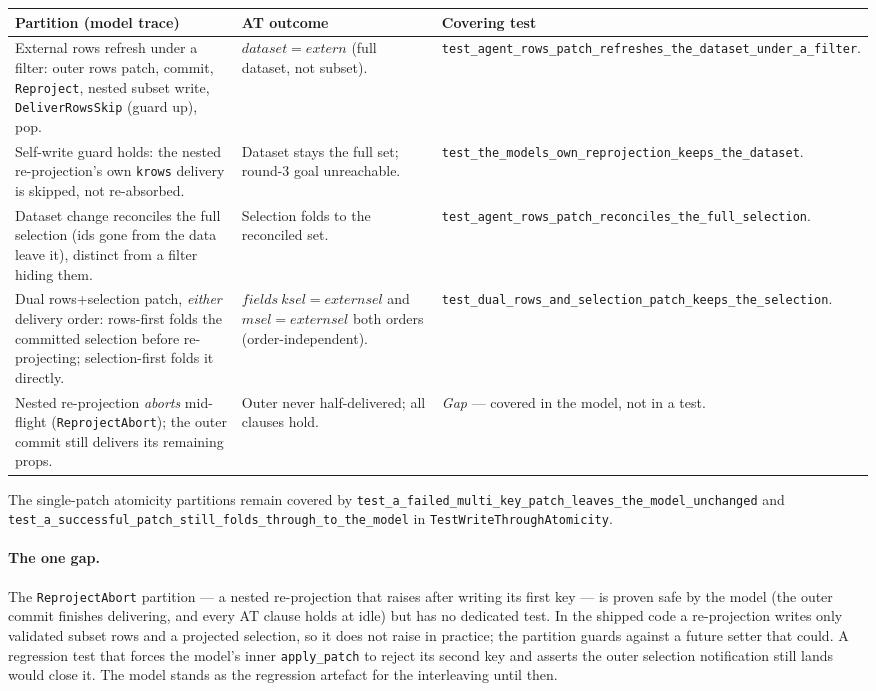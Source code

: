\documentclass[a4paper,10pt,fleqn]{article}
\begin{document}
\begin{center}
\begin{tabular}{p{4.6cm} p{3.0cm} p{5.2cm}}
\hline
\textbf{Partition (model trace)} & \textbf{AT outcome} & \textbf{Covering test} \\
\hline
External rows refresh under a filter: outer rows patch, commit,
\texttt{Reproject}, nested subset write, \texttt{DeliverRowsSkip} (guard up), pop. &
$dataset = extern$ (full dataset, not subset). &
\texttt{test\_agent\_rows\_patch\_refreshes\_the\_dataset\_under\_a\_filter}. \\
\hline
Self-write guard holds: the nested re-projection's own \texttt{krows} delivery is
skipped, not re-absorbed. &
Dataset stays the full set; round-3 goal unreachable. &
\texttt{test\_the\_models\_own\_reprojection\_keeps\_the\_dataset}. \\
\hline
Dataset change reconciles the full selection (ids gone from the data leave it),
distinct from a filter hiding them. &
Selection folds to the reconciled set. &
\texttt{test\_agent\_rows\_patch\_reconciles\_the\_full\_selection}. \\
\hline
Dual rows+selection patch, \emph{either} delivery order: rows-first folds the
committed selection before re-projecting; selection-first folds it directly. &
$fields~ksel = externsel$ and $msel = externsel$ both orders (order-independent). &
\texttt{test\_dual\_rows\_and\_selection\_patch\_keeps\_the\_selection}. \\
\hline
Nested re-projection \emph{aborts} mid-flight (\texttt{ReprojectAbort}); the outer
commit still delivers its remaining props. &
Outer never half-delivered; all clauses hold. &
\emph{Gap} --- covered in the model, not in a test. \\
\hline
\end{tabular}
\end{center}

The single-patch atomicity partitions remain covered by
\texttt{test\_a\_failed\_multi\_key\_patch\_leaves\_the\_model\_unchanged} and
\texttt{test\_a\_successful\_patch\_still\_folds\_through\_to\_the\_model} in
\texttt{TestWriteThroughAtomicity}.

\paragraph{The one gap.}  The \texttt{ReprojectAbort} partition --- a nested
re-projection that raises after writing its first key --- is proven safe by the
model (the outer commit finishes delivering, and every AT clause holds at idle)
but has no dedicated test.  In the shipped code a re-projection writes only
validated subset rows and a projected selection, so it does not raise in
practice; the partition guards against a future setter that could.  A regression
test that forces the model's inner \texttt{apply\_patch} to reject its second key
and asserts the outer selection notification still lands would close it.  The
model stands as the regression artefact for the interleaving until then.
\end{document}
